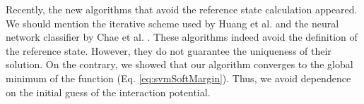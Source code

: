 %
Recently, the new algorithms that avoid the reference state calculation appeared. We should mention the iterative scheme used by Huang et al.\cite{Huang2008} and the neural network classifier by 
Chae et al. \cite{chae2010predicting}.
These algorithms indeed avoid the definition of the reference state. However, they do not guarantee the uniqueness of their solution. On the contrary, we showed that our 
algorithm converges to the global minimum of the function (Eq. \ref{eq:svmSoftMargin}). Thus, we avoid dependence on the initial guess of the interaction potential.
